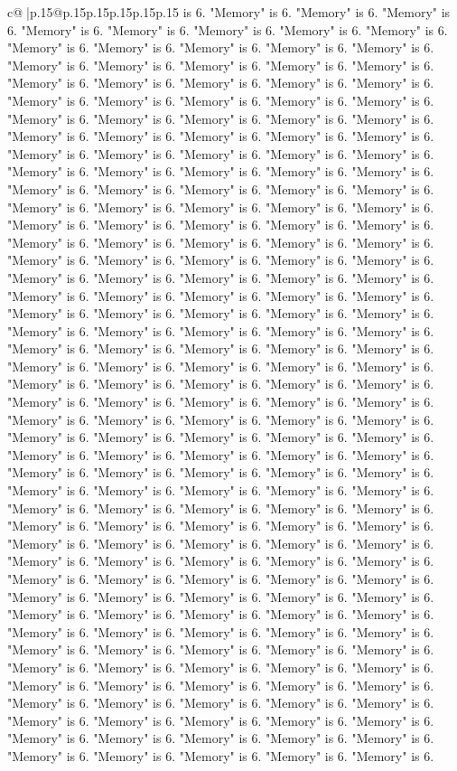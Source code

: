 \documentclass{article}
\begin{document}
{\begin{supertabular}{c@{$\;$}|p{.15\linewidth}@{}p{.15\linewidth}p{.15\linewidth}p{.15\linewidth}p{.15\linewidth}p{.15\linewidth}}
{{{is 6. "Memory" is 6. "Memory" is 6. "Memory" is 6. "Memory" is 6. "Memory" is 6. "Memory" is 6. "Memory" is 6. "Memory" is 6. "Memory" is 6. "Memory" is 6. "Memory" is 6. "Memory" is 6. "Memory" is 6. "Memory" is 6. "Memory" is 6. "Memory" is 6. "Memory" is 6. "Memory" is 6. "Memory" is 6. "Memory" is 6. "Memory" is 6. "Memory" is 6. "Memory" is 6. "Memory" is 6. "Memory" is 6. "Memory" is 6. "Memory" is 6. "Memory" is 6. "Memory" is 6. "Memory" is 6. "Memory" is 6. "Memory" is 6. "Memory" is 6. "Memory" is 6. "Memory" is 6. "Memory" is 6. "Memory" is 6. "Memory" is 6. "Memory" is 6. "Memory" is 6. "Memory" is 6. "Memory" is 6. "Memory" is 6. "Memory" is 6. "Memory" is 6. "Memory" is 6. "Memory" is 6. "Memory" is 6. "Memory" is 6. "Memory" is 6. "Memory" is 6. "Memory" is 6. "Memory" is 6. "Memory" is 6. "Memory" is 6. "Memory" is 6. "Memory" is 6. "Memory" is 6. "Memory" is 6. "Memory" is 6. "Memory" is 6. "Memory" is 6. "Memory" is 6. "Memory" is 6. "Memory" is 6. "Memory" is 6. "Memory" is 6. "Memory" is 6. "Memory" is 6. "Memory" is 6. "Memory" is 6. "Memory" is 6. "Memory" is 6. "Memory" is 6. "Memory" is 6. "Memory" is 6. "Memory" is 6. "Memory" is 6. "Memory" is 6. "Memory" is 6. "Memory" is 6. "Memory" is 6. "Memory" is 6. "Memory" is 6. "Memory" is 6. "Memory" is 6. "Memory" is 6. "Memory" is 6. "Memory" is 6. "Memory" is 6. "Memory" is 6. "Memory" is 6. "Memory" is 6. "Memory" is 6. "Memory" is 6. "Memory" is 6. "Memory" is 6. "Memory" is 6. "Memory" is 6. "Memory" is 6. "Memory" is 6. "Memory" is 6. "Memory" is 6. "Memory" is 6. "Memory" is 6. "Memory" is 6. "Memory" is 6. "Memory" is 6. "Memory" is 6. "Memory" is 6. "Memory" is 6. "Memory" is 6. "Memory" is 6. "Memory" is 6. "Memory" is 6. "Memory" is 6. "Memory" is 6. "Memory" is 6. "Memory" is 6. "Memory" is 6. "Memory" is 6. "Memory" is 6. "Memory" is 6. "Memory" is 6. "Memory" is 6. "Memory" is 6. "Memory" is 6. "Memory" is 6. "Memory" is 6. "Memory" is 6. "Memory" is 6. "Memory" is 6. "Memory" is 6. "Memory" is 6. "Memory" is 6. "Memory" is 6. "Memory" is 6. "Memory" is 6. "Memory" is 6. "Memory" is 6. "Memory" is 6. "Memory" is 6. "Memory" is 6. "Memory" is 6. "Memory" is 6. "Memory" is 6. "Memory" is 6. "Memory" is 6. "Memory" is 6. "Memory" is 6. "Memory" is 6. "Memory" is 6. "Memory" is 6. "Memory" is 6. "Memory" is 6. "Memory" is 6. "Memory" is 6. "Memory" is 6. "Memory" is 6. "Memory" is 6. "Memory" is 6. "Memory" is 6. "Memory" is 6. "Memory" is 6. "Memory" is 6. "Memory" is 6. "Memory" is 6. "Memory" is 6. "Memory" is 6. "Memory" is 6. "Memory" is 6. "Memory" is 6. "Memory" is 6. "Memory" is 6. "Memory" is 6. "Memory" is 6. "Memory" is 6. "Memory" is 6. "Memory" is 6. "Memory" is 6. "Memory" is 6. "Memory" is 6. "Memory" is 6. "Memory" is 6. "Memory" is 6. "Memory" is 6. "Memory" is 6. "Memory" is 6. "Memory" is 6. "Memory" is 6. "Memory" is 6. "Memory" is 6. "Memory" is 6. "Memory" is 6. "Memory" is 6. "Memory" is 6. "Memory" is 6. "Memory" is 6. "Memory" is 6. "Memory" is 6. "Memory" is 6. "Memory" is 6. "Memory" is 6. "Memory" is 6. "Memory" is 6. "Memory" is 6. "Memory" is 6. "Memory" is 6. "Memory" is 6. "Memory" is 6. "Memory" is 6. "Memory" is 6. "Memory" is 6. }}}
\end{supertabular}}
\end{document}
